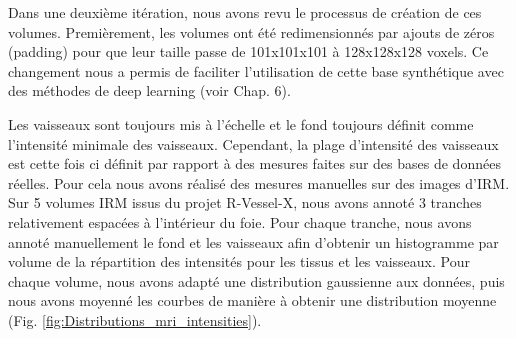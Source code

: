 Dans une deuxième itération, nous avons revu le processus de création de ces volumes. Premièrement, les volumes ont été redimensionnés par ajouts de zéros (padding) pour que leur taille passe de 101x101x101 à 128x128x128 voxels. Ce changement nous a permis de faciliter l'utilisation de cette base synthétique avec des méthodes de deep learning (voir Chap. 6).

Les vaisseaux sont toujours mis à l'échelle et le fond toujours définit comme l'intensité minimale des vaisseaux. Cependant, la plage d'intensité des vaisseaux est cette fois ci définit par rapport à des mesures faites sur des bases de données réelles. Pour cela nous avons réalisé des mesures manuelles sur des images d'IRM. Sur 5 volumes IRM issus du projet R-Vessel-X, nous avons annoté 3 tranches relativement espacées à l'intérieur du foie. Pour chaque tranche, nous avons annoté manuellement le fond et les vaisseaux afin d'obtenir un histogramme par volume de la répartition des intensités pour les tissus et les vaisseaux. Pour chaque volume, nous avons adapté une distribution gaussienne aux données, puis nous avons moyenné les courbes de manière à obtenir une distribution moyenne (Fig. \ref{fig:Distributions_mri_intensities}).

